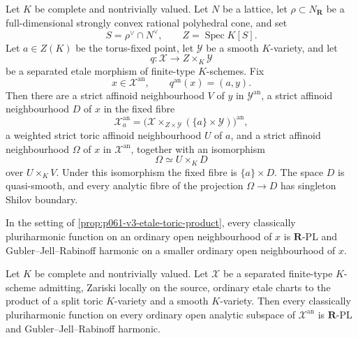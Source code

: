 \begin{proposition}
\label{prop:p061-v3-etale-toric-product}
Let \(K\) be complete and nontrivially valued. Let \(N\) be a lattice,
let \(\rho\subset N_{\mathbf R}\) be a full-dimensional strongly convex
rational polyhedral cone, and set
\[
 S=\rho^\vee\cap N^\vee,
 \qquad Z=\operatorname{Spec}K[S].
\]
Let \(a\in Z(K)\) be the torus-fixed point, let \(\mathcal Y\) be a
smooth \(K\)-variety, and let
\[
 q:\mathcal X\longrightarrow Z\times_K\mathcal Y
\]
be a separated etale morphism of finite-type \(K\)-schemes. Fix
\[
 x\in\mathcal X^{\mathrm{an}},
 \qquad q^{\mathrm{an}}(x)=(a,y).
\]
Then there are a strict affinoid neighbourhood \(V\) of \(y\) in
\(\mathcal Y^{\mathrm{an}}\), a strict affinoid neighbourhood \(D\) of
\(x\) in the fixed fibre
\[
 \mathcal X_a^{\mathrm{an}}
 =\bigl(\mathcal X\times_{Z\times\mathcal Y}
        (\{a\}\times\mathcal Y)\bigr)^{\mathrm{an}},
\]
a weighted strict toric affinoid neighbourhood \(U\) of \(a\), and a
strict affinoid neighbourhood \(\Omega\) of \(x\) in
\(\mathcal X^{\mathrm{an}}\), together with an isomorphism
\begin{equation}\label{eq:p061-v3-actual-product}
                            \Omega\simeq U\times_KD
\end{equation}
over \(U\times_KV\). Under this isomorphism the fixed fibre is
\(\{a\}\times D\). The space \(D\) is quasi-smooth, and every analytic
fibre of the projection \(\Omega\to D\) has singleton Shilov boundary.
\end{proposition}

\begin{theorem}
\label{thm:p061-v3-etale-toroidal-ph-rpl}
In the setting of \cref{prop:p061-v3-etale-toric-product}, every
classically pluriharmonic function on an ordinary open neighbourhood of
\(x\) is \(\mathbf R\)-PL and Gubler--Jell--Rabinoff harmonic on a smaller
ordinary open neighbourhood of \(x\).
\end{theorem}

\begin{corollary}
\label{cor:p061-v3-zariski-etale-toric-charts}
Let \(K\) be complete and nontrivially valued. Let \(\mathcal X\) be a
separated finite-type \(K\)-scheme admitting, Zariski locally on the
source, ordinary etale charts to the product of a split toric
\(K\)-variety and a smooth \(K\)-variety. Then every classically
pluriharmonic function on every ordinary open analytic subspace of
\(\mathcal X^{\mathrm{an}}\) is \(\mathbf R\)-PL and
Gubler--Jell--Rabinoff harmonic.
\end{corollary}


